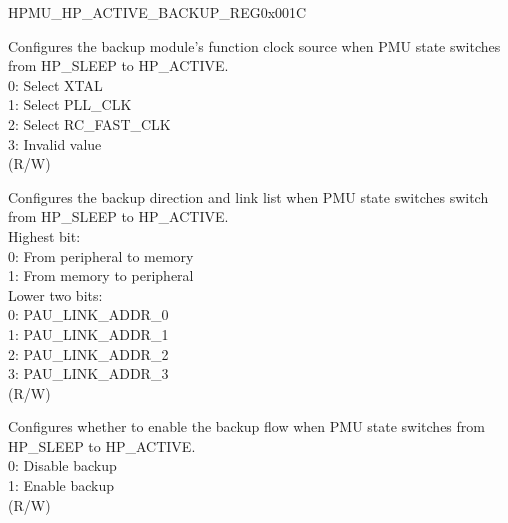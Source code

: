 \begin{register}{H}{PMU\_HP\_ACTIVE\_BACKUP\_REG}{0x001C}\label{regdesc:PMUHPACTIVEBACKUPREG}
%
%
%
%
%
%
%
%
%
%
%
%
%
%
%
\regnewline%
\begin{regdesc}\begin{reglist}
\label{fielddesc:PMUHPSLEEP2ACTIVEBACKUPCLKSEL}\item [PMU\_HP\_SLEEP2ACTIVE\_BACKUP\_CLK\_SEL] Configures the backup module's function clock source when PMU state switches from HP\_SLEEP to HP\_ACTIVE.\\
0: Select XTAL\\
1: Select PLL\_CLK\\
2: Select RC\_FAST\_CLK\\
3: Invalid value\\
(R/W)

\label{fielddesc:PMUHPSLEEP2ACTIVEBACKUPMODE}\item [PMU\_HP\_SLEEP2ACTIVE\_BACKUP\_MODE] Configures the backup direction and link list when PMU state switches switch from HP\_SLEEP to HP\_ACTIVE.\\
Highest bit:\\
0: From peripheral to memory\\
1: From memory to peripheral\\
Lower two bits:\\
0: PAU\_LINK\_ADDR\_0 \\
1: PAU\_LINK\_ADDR\_1 \\
2: PAU\_LINK\_ADDR\_2 \\
3: PAU\_LINK\_ADDR\_3 \\
(R/W)

\label{fielddesc:PMUHPSLEEP2ACTIVEBACKUPEN}\item [PMU\_HP\_SLEEP2ACTIVE\_BACKUP\_EN] Configures whether to enable the backup flow when PMU state switches from HP\_SLEEP to HP\_ACTIVE. \\
0: Disable backup\\
1: Enable backup\\
(R/W)

\end{reglist}\end{regdesc}
\end{register}


